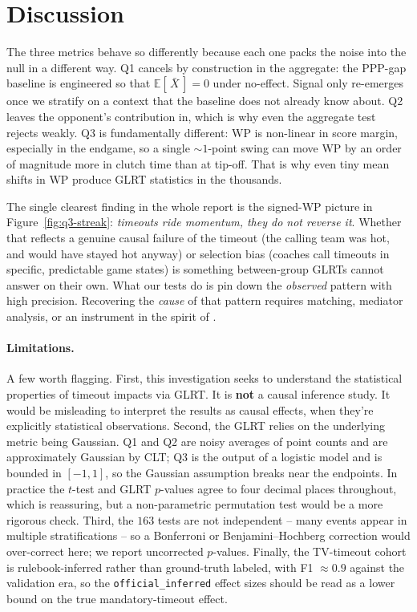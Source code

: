 \documentclass[twoside,11pt]{article}
\begin{document}
\section{Discussion}
\label{sec:discussion}

The three metrics behave so differently because each one packs the
noise into the null in a different way. Q1 cancels by construction in
the aggregate: the PPP-gap baseline is engineered so that
$\mathbb{E}[\,\bar X\,] = 0$ under no-effect. Signal only re-emerges
once we stratify on a context that the baseline does not already know
about. Q2 leaves the opponent's contribution in, which is why even the
aggregate test rejects weakly. Q3 is fundamentally different: WP is
non-linear in score margin, especially in the endgame, so a single
$\sim\!1$-point swing can move WP by an order of magnitude more in
clutch time than at tip-off. That is why even tiny mean shifts in WP
produce GLRT statistics in the thousands.

The single clearest finding in the whole report is the signed-WP
picture in Figure~\ref{fig:q3-streak}: \emph{timeouts ride momentum,
they do not reverse it}. Whether that reflects a genuine causal failure
of the timeout (the calling team was hot, and would have stayed hot
anyway) or selection bias (coaches call timeouts in specific,
predictable game states) is something between-group GLRTs cannot
answer on their own. What our tests do is pin down the \emph{observed}
pattern with high precision. Recovering the \emph{cause} of that
pattern requires matching, mediator analysis, or an instrument in the
spirit of \citet{weimer2023causal}.

\paragraph{Limitations.} A few worth flagging. First, this investigation seeks to understand the statistical
properties of timeout impacts via GLRT. It is \textbf{not} a causal inference study. It would be
misleading to interpret the results as causal effects, when they're explicitly statistical observations.
Second, the GLRT relies on the underlying metric being Gaussian. Q1 and Q2 are noisy averages
of point counts and are approximately Gaussian by CLT; Q3 is the output
of a logistic model and is bounded in $[-1, 1]$, so the Gaussian
assumption breaks near the endpoints. In practice the $t$-test and
GLRT $p$-values agree to four decimal places throughout, which is
reassuring, but a non-parametric permutation test would be a more
rigorous check. Third, the $163$ tests are not independent -- many
events appear in multiple stratifications -- so a
Bonferroni or Benjamini--Hochberg correction would over-correct here;
we report uncorrected $p$-values. Finally, the TV-timeout cohort is
rulebook-inferred rather than ground-truth labeled, with
F1 $\approx 0.9$ against the validation era, so the
\texttt{official\_inferred} effect sizes should be read as a lower
bound on the true mandatory-timeout effect.
\end{document}
